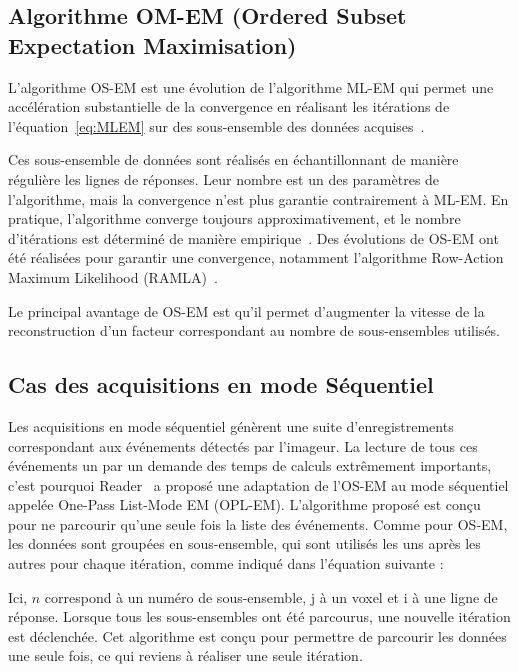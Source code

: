 	\subsection{Algorithme OM-EM (Ordered Subset Expectation Maximisation)}

L'algorithme OS-EM est une évolution de l'algorithme ML-EM  qui permet une accélération substantielle de la convergence en réalisant les itérations de l'équation~\ref{eq:MLEM} sur des sous-ensemble des données acquises~\cite{hudson1994accelerated}. 

Ces sous-ensemble de données sont réalisés en échantillonnant de manière régulière les lignes de réponses. Leur nombre est un des paramètres de l'algorithme, mais la convergence n'est plus garantie contrairement à ML-EM. En pratique, l'algorithme converge toujours approximativement, et le nombre d'itérations est déterminé de manière empirique~\cite{bailey2005positon}. Des évolutions de OS-EM ont été réalisées pour garantir une convergence, notamment l'algorithme Row-Action Maximum Likelihood (RAMLA)~\cite{browne1996row, chiang2004clinical}.

Le principal avantage de OS-EM est qu'il permet d'augmenter la vitesse de la reconstruction d'un facteur correspondant au nombre de sous-ensembles utilisés.

	\subsection{Cas des acquisitions en mode Séquentiel}
\label{lab:OPLEM}

Les acquisitions en mode séquentiel génèrent une suite d'enregistrements correspondant aux événements détectés par l'imageur. La lecture de tous ces événements un par un demande des temps de calculs extrêmement importants, c'est pourquoi Reader~\cite{reader2002one} a proposé une adaptation de l'OS-EM au mode séquentiel appelée One-Pass List-Mode EM (OPL-EM). L'algorithme proposé est conçu pour ne parcourir qu'une seule fois la liste des événements. Comme pour OS-EM, les données sont groupées en sous-ensemble, qui sont utilisés les uns après les autres pour chaque itération, comme indiqué dans l'équation suivante :

Ici, $n$ correspond à un numéro de sous-ensemble, j à un voxel et i à une ligne de réponse. Lorsque tous les sous-ensembles ont été parcourus, une nouvelle itération est déclenchée. Cet algorithme est conçu pour permettre de parcourir les données une seule fois, ce qui reviens à réaliser une seule itération.

